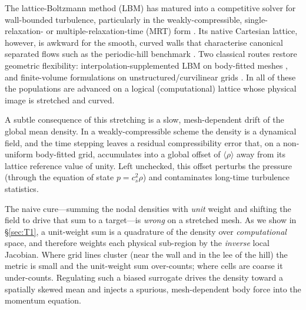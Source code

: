 \documentclass[11pt]{article}
\theoremstyle{definition}
\theoremstyle{remark}
\begin{document}
The lattice-Boltzmann method (LBM) has matured into a competitive solver for
wall-bounded turbulence, particularly in the weakly-compressible,
single-relaxation- or multiple-relaxation-time (MRT) form
\cite{Qian1992,dHumieres2002,Kruger2017,Succi2001}. Its native Cartesian lattice, however,
is awkward for the smooth, curved walls that characterise canonical separated
flows such as the periodic-hill benchmark \cite{Frohlich2005,Breuer2009}. Two
classical routes restore geometric flexibility: interpolation-supplemented LBM
on body-fitted meshes \cite{He1997,FilippovaHanel1998}, and finite-volume
formulations on unstructured/curvilinear grids \cite{Barth1991}. In all of these
the populations are advanced on a logical (computational) lattice whose physical
image is stretched and curved.

A subtle consequence of this stretching is a slow, mesh-dependent drift of the
global mean density. In a weakly-compressible scheme the density is a dynamical
field, and the time stepping leaves a residual compressibility error that, on a
non-uniform body-fitted grid, accumulates into a global offset of
$\langle\rho\rangle$ away from its lattice reference value of unity. Left
unchecked, this offset perturbs the pressure (through the equation of state
$p=c_s^2\rho$) and contaminates long-time turbulence statistics.

The naive cure---summing the nodal densities with \emph{unit} weight and
shifting the field to drive that sum to a target---is \emph{wrong} on a stretched
mesh. As we show in \S\ref{sec:T1}, a unit-weight sum is a quadrature of the
density over \emph{computational} space, and therefore weights each physical
sub-region by the \emph{inverse} local Jacobian. Where grid lines cluster (near
the wall and in the lee of the hill) the metric is small and the unit-weight sum
over-counts; where cells are coarse it under-counts. Regulating such a biased
surrogate drives the density toward a spatially skewed mean and injects a
spurious, mesh-dependent body force into the momentum equation.
\end{document}
